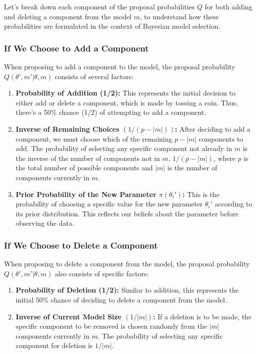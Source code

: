 \documentclass[10pt]{article}
\begin{document}
Let's break down each component of the proposal probabilities \(Q\) for both adding and deleting a component from the model \(m\), to understand how these probabilities are formulated in the context of Bayesian model selection.

\subsubsection*{If We Choose to Add a Component}
When proposing to add a component to the model, the proposal probability \(Q(\theta', m' | \theta, m)\) consists of several factors:

\begin{enumerate}
  \item \textbf{Probability of Addition (1/2):} This represents the initial decision to either add or delete a component, which is made by tossing a coin. Thus, there's a 50\% chance (1/2) of attempting to add a component.

  \item \textbf{Inverse of Remaining Choices \((1/(p-|m|))\):} After deciding to add a component, we must choose which of the remaining \(p-|m|\) components to add. The probability of selecting any specific component not already in \(m\) is the inverse of the number of components not in \(m\), \(1/(p-|m|)\), where \(p\) is the total number of possible components and \(|m|\) is the number of components currently in \(m\).

  \item \textbf{Prior Probability of the New Parameter \(\pi(\theta_i')\):} This is the probability of choosing a specific value for the new parameter \(\theta_i'\) according to its prior distribution. This reflects our beliefs about the parameter before observing the data.

\end{enumerate}

\subsubsection*{If We Choose to Delete a Component}
When proposing to delete a component from the model, the proposal probability \(Q(\theta', m' | \theta, m)\) also consists of specific factors:

\begin{enumerate}
  \item \textbf{Probability of Deletion (1/2):} Similar to addition, this represents the initial 50\% chance of deciding to delete a component from the model.

  \item \textbf{Inverse of Current Model Size \((1/|m|)\):} If a deletion is to be made, the specific component to be removed is chosen randomly from the \(|m|\) components currently in \(m\). The probability of selecting any specific component for deletion is \(1/|m|\).

\end{enumerate}
\end{document}
